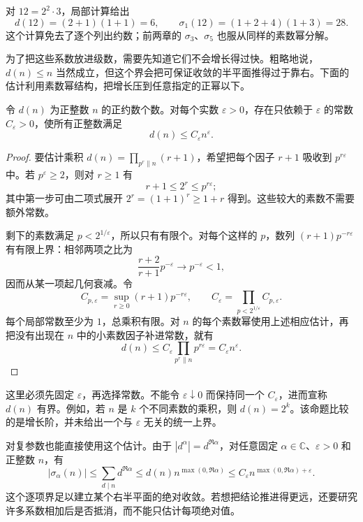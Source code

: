 对 \(12=2^2\cdot3\)，局部计算给出
\[
 d(12)=(2+1)(1+1)=6,
 \qquad \sigma_1(12)=(1+2+4)(1+3)=28.
\]
这个计算免去了逐个列出约数；前两章的 \(\sigma_3\)、\(\sigma_5\) 也服从同样的素数幂分解。

为了把这些系数放进级数，需要先知道它们不会增长得过快。粗略地说，\(d(n)\le n\) 当然成立，但这个界会把可保证收敛的半平面推得过于靠右。下面的估计利用素数幂结构，把增长压到任意指定的正幂以下。

\begin{proposition}[除数个数的缓慢增长]
\label{b3:prop:25-divisor-small-power}
令 \(d(n)\) 为正整数 \(n\) 的正约数个数。对每个实数 \(\varepsilon>0\)，存在只依赖于 \(\varepsilon\) 的常数 \(C_\varepsilon>0\)，使所有正整数满足
\[
 d(n)\le C_\varepsilon n^\varepsilon.
\]
\end{proposition}
\begin{proof}
要估计乘积 \(d(n)=\prod_{p^r\parallel n}(r+1)\)，希望把每个因子 \(r+1\) 吸收到 \(p^{r\varepsilon}\) 中。若 \(p^\varepsilon\ge2\)，则对 \(r\ge1\) 有
\[
 r+1\le2^r\le p^{r\varepsilon};
\]
其中第一步可由二项式展开 \(2^r=(1+1)^r\ge1+r\) 得到。这些较大的素数不需要额外常数。

剩下的素数满足 \(p<2^{1/\varepsilon}\)，所以只有有限个。对每个这样的 \(p\)，数列 \((r+1)p^{-r\varepsilon}\) 有有限上界：相邻两项之比为
\[
 \frac{r+2}{r+1}p^{-\varepsilon}\longrightarrow p^{-\varepsilon}<1,
\]
因而从某一项起几何衰减。令
\[
 C_{p,\varepsilon}=\sup_{r\ge0}(r+1)p^{-r\varepsilon},
 \qquad
 C_\varepsilon=\prod_{p<2^{1/\varepsilon}}C_{p,\varepsilon}.
\]
每个局部常数至少为 \(1\)，总乘积有限。对 \(n\) 的每个素数幂使用上述相应估计，再把没有出现在 \(n\) 中的小素数因子补进常数，就有
\[
 d(n)\le C_\varepsilon\prod_{p^r\parallel n}p^{r\varepsilon}
       =C_\varepsilon n^\varepsilon.
\]
\end{proof}

这里必须先固定 \(\varepsilon\)，再选择常数。不能令 \(\varepsilon\downarrow0\) 而保持同一个 \(C_\varepsilon\)，进而宣称 \(d(n)\) 有界。例如，若 \(n\) 是 \(k\) 个不同素数的乘积，则 \(d(n)=2^k\)。该命题比较的是增长阶，并未给出一个与 \(\varepsilon\) 无关的统一上界。

对复参数也能直接使用这个估计。由于 \(|d^\alpha|=d^{\Re\alpha}\)，对任意固定 \(\alpha\in\mathbb C\)、\(\varepsilon>0\) 和正整数 \(n\)，有
\[
 |\sigma_\alpha(n)|
 \le\sum_{d\mid n}d^{\Re\alpha}
 \le d(n)n^{\max(0,\Re\alpha)}
 \le C_\varepsilon n^{\max(0,\Re\alpha)+\varepsilon}.
\]
这个逐项界足以建立某个右半平面的绝对收敛。若想把结论推进得更远，还要研究许多系数相加后是否抵消，而不能只估计每项绝对值。

